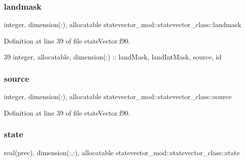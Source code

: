 \subsubsection{\texorpdfstring{landmask}{landmask}}
{\footnotesize\ttfamily integer, dimension(\+:), allocatable statevector\+\_\+mod\+::statevector\+\_\+class\+::landmask\hspace{0.3cm}{\ttfamily [private]}}



Definition at line 39 of file state\+Vector.\+f90.


\begin{DoxyCode}
39         \textcolor{keywordtype}{integer}, \textcolor{keywordtype}{allocatable}, \textcolor{keywordtype}{dimension(:)} :: landMask, landIntMask, source, id
\end{DoxyCode}
\mbox{\label{structstatevector__mod_1_1statevector__class_a26d6d27fd085846016d83c6e38781416}} 
\subsubsection{\texorpdfstring{source}{source}}
{\footnotesize\ttfamily integer, dimension(\+:), allocatable statevector\+\_\+mod\+::statevector\+\_\+class\+::source\hspace{0.3cm}{\ttfamily [private]}}



Definition at line 39 of file state\+Vector.\+f90.

\mbox{\label{structstatevector__mod_1_1statevector__class_a2934e9cc937ca318cbbe490dd391cf88}} 
\subsubsection{\texorpdfstring{state}{state}}
{\footnotesize\ttfamily real(prec), dimension(\+:,\+:), allocatable statevector\+\_\+mod\+::statevector\+\_\+class\+::state\hspace{0.3cm}{\ttfamily [private]}}



